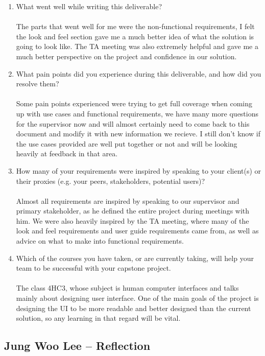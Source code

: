 \documentclass[12pt]{article}
\begin{document}
\begin{enumerate}
  \item What went well while writing this deliverable?\\\\
  The parts that went well for me were the non-functional requirements, I felt
  the look and feel section gave me a much better idea of what the solution is
  going to look like. The TA meeting was also extremely helpful and gave me a
  much better perspective on the project and confidence in our solution.
  \item What pain points did you experience during this deliverable, and how
  did you resolve them?\\\\
  Some pain points experienced were trying to get full coverage when coming up
  with use cases and functional requirements, we have many more questions for
  the supervisor now and will almost certainly need to come back to this
  document and modify it with new information we recieve. I still don't know
  if the use cases provided are well put together or not and will be looking
  heavily at feedback in that area.
  \item How many of your requirements were inspired by speaking to your
  client(s) or their proxies (e.g. your peers, stakeholders, potential users)?
  \\\\
  Almost all requirements are inspired by speaking to our supervisor and
  primary stakeholder, as he defined the entire project during meetings with
  him. We were also heavily inspired by the TA meeting, where many of the
  look and feel requirements and user guide requirements came from, as well
  as advice on what to make into functional requirements.
  \item Which of the courses you have taken, or are currently taking, will help
  your team to be successful with your capstone project.\\\\
  The class 4HC3, whose subject is human computer interfaces and talks mainly
  about designing user interface. One of the main goals of the project is
  designing the UI to be more readable and better designed than the current
  solution, so any learning in that regard will be vital.

\end{enumerate}

\subsection*{Jung Woo Lee -- Reflection}
\end{document}
